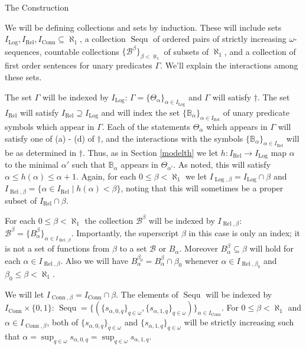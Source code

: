 \documentclass{amsart}
\theoremstyle{definition}\newtheorem{theorem}{Theorem}
\theoremstyle{definition}\newtheorem{bigtheorem}{Theorem}
\numberwithin{theorem}{section}
\theoremstyle{definition}\newtheorem{corollary}[theorem]{Corollary}
\theoremstyle{definition}\newtheorem{proposition}[theorem]{Proposition}
\theoremstyle{definition}\newtheorem{definition}[theorem]{Definition}
\theoremstyle{definition}\newtheorem{question}[theorem]{Question}
\theoremstyle{definition}\newtheorem{example}[theorem]{Example}
\theoremstyle{definition}\newtheorem{remark}[theorem]{Remark}
\theoremstyle{definition}\newtheorem{note}[theorem]{Note}
\theoremstyle{definition}\newtheorem{lemma}[theorem]{Lemma}
\theoremstyle{definition}\newtheorem{fact}[theorem]{Fact}
\theoremstyle{definition}\newtheorem{define}[theorem]{Definition}
\theoremstyle{definition}\newtheorem{definitions}[theorem]{Definitions}
\theoremstyle{definition}\newtheorem{claim}[theorem]{Claim}
\theoremstyle{definition}\newtheorem{obs}[theorem]{Observation}
\theoremstyle{definition}\newtheorem{construction}[theorem]{Construction}
\newcommand{\B}{\mathbb{B}}
\newcommand{\Rel}{\operatorname{Rel}}
\newcommand{\Log}{\operatorname{Log}}
\newcommand{\Conn}{\operatorname{Conn}}
\newcommand{\Bo}{\mathcal{B}}
\newcommand{\Sequ}{\operatorname{Sequ}}
\begin{document}
\begin{section}{The Construction}\label{construction}

We will be defining collections and sets by induction.  These will include sets $I_{\Log}, I_{\Rel}, I_{\Conn} \subseteq \aleph_1$, a collection $\Sequ$ of ordered pairs of strictly increasing $\omega$-sequences, countable collections $\{\Bo^{\beta}\}_{\beta< \aleph_1}$ of subsets of $\aleph_1$, and a collection of first order sentences for unary predicates $\Gamma$.  We'll explain the interactions among these sets.

The set $\Gamma$ will be indexed by $I_{\Log}$: $\Gamma = \{\Theta_{\alpha}\}_{\alpha \in I_{\Log}}$ and $\Gamma$ will satisfy $\dagger$.  The set $I_{\Rel}$ will satisfy $I_{\Rel} \supseteq I_{\Log}$ and will index the set $\{\B_{\alpha}\}_{\alpha \in I_{\Rel}}$ of unary predicate symbols which appear in $\Gamma$.  Each of the statements $\Theta_{\alpha}$ which appears in $\Gamma$ will satisfy one of (a) - (d) of $\dagger$, and the interactions with the symbols $\{\B_{\alpha}\}_{\alpha \in I_{\Rel}}$ will be as determined in $\dagger$.  Thus, as in Section \ref{modelth} we let $h: I_{\Rel} \rightarrow I_{\Log}$ map $\alpha$ to the minimal $\alpha'$ such that $\B_{\alpha}$ appears in $\Theta_{\alpha'}$.  As noted, this will satisfy $\alpha \leq h(\alpha) \leq \alpha +1$.  Again, for each $0 \leq \beta < \aleph_1$ we let $I_{\Log, \beta} = I_{\Log} \cap \beta$ and $I_{\Rel, \beta} = \{\alpha \in I_{\Rel} \mid h(\alpha)<\beta\}$, noting that this will sometimes be a proper subset of $I_{\Rel} \cap \beta$.

For each $0 \leq \beta < \aleph_1$ the collection $\Bo^{\beta}$ will be indexed by $I_{\Rel, \beta}$: $\Bo^{\beta} = \{B_{\alpha}^{\beta}\}_{\alpha \in I_{\Rel, \beta}}$.  Importantly, the superscript $\beta$ in this case is only an index; it is not a set of functions from $\beta$ to a set $\Bo$ or $B_{\alpha}$.  Moreover $B_{\alpha}^{\beta} \subseteq \beta$ will hold for each $\alpha\in I_{\Rel, \beta}$.  Also we will have $B_{\alpha}^{\beta_0}  = B_{\alpha}^{\beta} \cap \beta_0$ whenever $\alpha \in I_{\Rel, \beta_0}$ and $\beta_0 \leq \beta < \aleph_1$.

We will let $I_{\Conn, \beta} = I_{\Conn} \cap \beta$.  The elements of $\Sequ$ will be indexed by $I_{\Conn} \times \{0, 1\}$: $\Sequ = \{(\{s_{\alpha, 0, q}\}_{q \in \omega}, \{s_{\alpha, 1, q}\}_{q \in \omega})\}_{\alpha \in I_{\Conn}}$.  For $0 \leq \beta<\aleph_1$ and $\alpha \in I_{\Conn, \beta}$, both of $\{s_{\alpha, 0, q}\}_{q\in \omega}$ and $\{s_{\alpha, 1, q}\}_{q \in \omega}$ will be strictly increasing such that $\alpha = \sup_{q \in \omega} s_{\alpha, 0, q} = \sup_{q\in \omega} s_{\alpha, 1, q}$.



\end{section}
\end{document}
